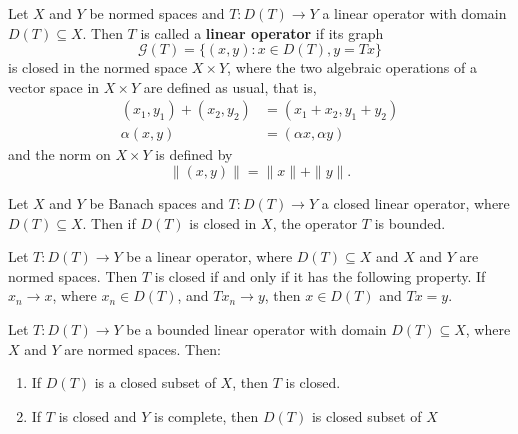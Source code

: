 \begin{definition}
    Let \( X  \) and \( Y  \) be normed spaces and \( T : D(T) \to Y  \) a linear operator with domain \( D(T) \subseteq  X  \). Then \( T  \) is called a \textbf{linear operator} if its graph  
    \[  \mathcal{G}(T) = \{ (x,y) : x \in D(T)  ,  y = Tx \}  \]
    is closed in the normed space \( X \times Y  \), where the two algebraic operations of a vector space in \( X \times Y  \) are defined as usual, that is, 
    \begin{align*}
        ({x}_{1}, {y}_{1}) + ({x}_{2}, {y}_{2}) &= ({x}_{1} + {x}_{2} , {y}_{1} + {y}_{2}) \\
        \alpha (x,y) &= (\alpha x , \alpha y)
    \end{align*}
    and the norm on \( X \times Y  \) is defined by
    \[  \|(x,y)\|  = \|x \| + \|y\|. \]
\end{definition}

\begin{theorem}
    Let \( X  \) and \( Y  \) be Banach spaces and \( T: D(T) \to Y  \) a closed linear operator, where \( D(T) \subseteq  X  \). Then if \( D(T) \) is closed in \( X  \), the operator \( T  \) is bounded.
\end{theorem}

\begin{theorem}
    Let \( T : D(T) \to Y  \) be a linear operator, where \( D(T) \subseteq X  \) and \( X  \) and \( Y  \) are normed spaces. Then \( T  \) is closed if and only if it has the following property. If \( {x}_{n} \to x  \), where \( {x}_{n} \in D(T) \), and \( T {x}_{n} \to y  \), then \( x \in D(T) \) and \( Tx = y  \).
\end{theorem}

\begin{lemma}
    Let \( T: D(T) \to Y  \) be a bounded linear operator with domain \( D(T) \subseteq X  \), where \( X  \) and \( Y  \) are normed spaces. Then:
    \begin{enumerate}
        \item[(a)] If \( D(T)  \) is a closed subset of \( X  \), then \( T  \) is closed.
        \item[(b)] If \( T  \) is closed and \( Y  \) is complete, then \( D(T)  \) is closed subset of \( X  \)
    \end{enumerate} 
\end{lemma}
